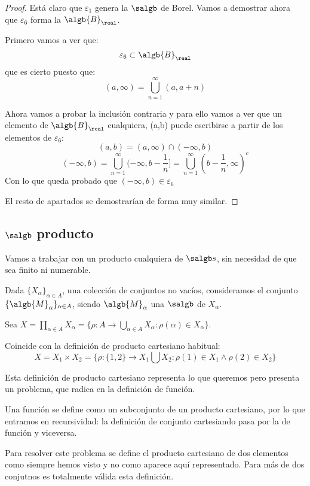 \documentclass{apuntes}
\begin{document}
\begin{proof}
Está claro que $\varepsilon_1$ genera la $\salgb$ de Borel. Vamos a demostrar ahora que $\varepsilon_6$ forma la $\algb{B}_\real$.

Primero vamos a ver que:
\[\varepsilon_6 \subset \algb{B}_\real\]
que es cierto puesto que:
\[(a, \infty) = \bigcup_{n=1}^{\infty}(a,a+n)\]

Ahora vamos a probar la inclusión contraria y para ello vamos a ver que un elemento de $\algb{B}_\real$ cualquiera, (a,b) puede escribirse a partir de los elementos de $\varepsilon_6$:
\[(a,b) = (a, \infty) \cap (-\infty, b)\]
\[(-\infty, b) = \bigcup_{n=1}^{\infty}(- \infty, b - \frac{1}{n}]=\bigcup_{n=1}^{\infty}(b-\frac{1}{n}, \infty)^c\]
Con lo que queda probado que $(-\infty, b) \in \varepsilon_6$

El resto de apartados se demostrarían de forma muy similar.
\end{proof}

\subsection{$\salgb$ producto}
Vamos a trabajar con un producto cualquiera de $\salgb s$, sin necesidad de que sea finito ni numerable.

Dada $\{X_\alpha\}_{\alpha\in A}$, una colección de conjuntos no vacíos, consideramos el conjunto $\{\algb{M}_\alpha\}_{\alpha\in A}$, siendo $\algb{M}_\alpha$ una $\salgb$ de $X_\alpha$.

Sea $X=\prod_{\alpha\in A}X_\alpha=\{\rho: A \rightarrow \bigcup_{\alpha\in A} X_\alpha : \rho(\alpha)\in X_\alpha\}$.


\obs Coincide con la definición de producto cartesiano habitual: \[X=X_1\times X_2=\{\rho: \{1,2\} \rightarrow X_1 \bigcup X_2 : \rho(1)\in X_1 \wedge \rho(2) \in X_2\}\]

Esta definición de producto cartesiano representa lo que queremos pero presenta un problema, que radica en la definición de función.

Una función se define como un subconjunto de un producto cartesiano, por lo que entramos en recursividad: la definición de conjunto cartesiando pasa por la de función y viceversa.

 Para resolver este problema se define el producto cartesiano de dos elementos como siempre hemos visto y no como aparece aquí representado. Para más de dos conjutnos es totalmente válida esta definición.
\end{document}
